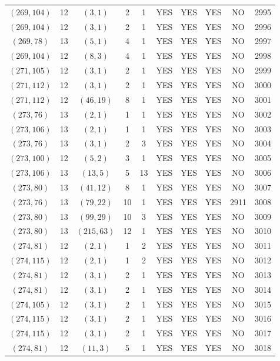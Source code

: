 \begin{longtable}{|c|c|c|c|c|c|c|c|c|c|}
$(269, 104)$ & 12 & $(3, 1)$ & 2 & 1 & YES & YES & YES & NO & 2995\\
$(269, 104)$ & 12 & $(3, 1)$ & 2 & 1 & YES & YES & YES & NO & 2996\\
$(269, 78)$ & 13 & $(5, 1)$ & 4 & 1 & YES & YES & YES & NO & 2997\\
$(269, 104)$ & 12 & $(8, 3)$ & 4 & 1 & YES & YES & YES & NO & 2998\\
$(271, 105)$ & 12 & $(3, 1)$ & 2 & 1 & YES & YES & YES & NO & 2999\\
$(271, 112)$ & 12 & $(3, 1)$ & 2 & 1 & YES & YES & YES & NO & 3000\\
$(271, 112)$ & 12 & $(46, 19)$ & 8 & 1 & YES & YES & YES & NO & 3001\\
$(273, 76)$ & 13 & $(2, 1)$ & 1 & 1 & YES & YES & YES & NO & 3002\\
$(273, 106)$ & 13 & $(2, 1)$ & 1 & 1 & YES & YES & YES & NO & 3003\\
$(273, 76)$ & 13 & $(3, 1)$ & 2 & 3 & YES & YES & YES & NO & 3004\\
$(273, 100)$ & 12 & $(5, 2)$ & 3 & 1 & YES & YES & YES & NO & 3005\\
$(273, 106)$ & 13 & $(13, 5)$ & 5 & 13 & YES & YES & YES & NO & 3006\\
$(273, 80)$ & 13 & $(41, 12)$ & 8 & 1 & YES & YES & YES & NO & 3007\\
$(273, 76)$ & 13 & $(79, 22)$ & 10 & 1 & YES & YES & YES & 2911 & 3008\\
$(273, 80)$ & 13 & $(99, 29)$ & 10 & 3 & YES & YES & YES & NO & 3009\\
$(273, 80)$ & 13 & $(215, 63)$ & 12 & 1 & YES & YES & YES & NO & 3010\\
$(274, 81)$ & 12 & $(2, 1)$ & 1 & 2 & YES & YES & YES & NO & 3011\\
$(274, 115)$ & 12 & $(2, 1)$ & 1 & 2 & YES & YES & YES & NO & 3012\\
$(274, 81)$ & 12 & $(3, 1)$ & 2 & 1 & YES & YES & YES & NO & 3013\\
$(274, 81)$ & 12 & $(3, 1)$ & 2 & 1 & YES & YES & YES & NO & 3014\\
$(274, 105)$ & 12 & $(3, 1)$ & 2 & 1 & YES & YES & YES & NO & 3015\\
$(274, 115)$ & 12 & $(3, 1)$ & 2 & 1 & YES & YES & YES & NO & 3016\\
$(274, 115)$ & 12 & $(3, 1)$ & 2 & 1 & YES & YES & YES & NO & 3017\\
$(274, 81)$ & 12 & $(11, 3)$ & 5 & 1 & YES & YES & YES & NO & 3018\\

\end{longtable}
